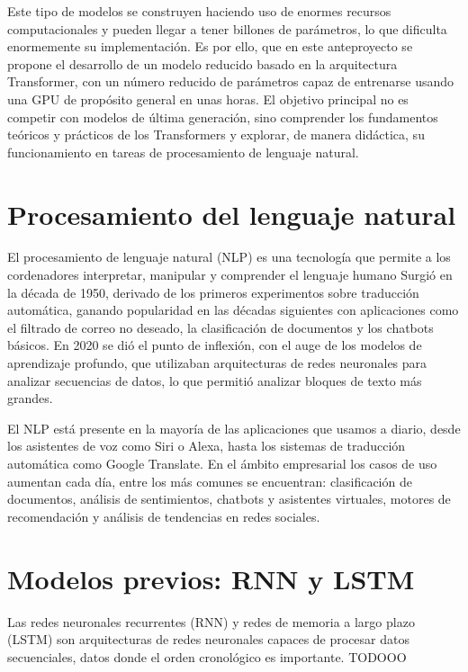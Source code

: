 \documentclass[11pt]{book}
\begin{document}
Este tipo de modelos se construyen haciendo uso de enormes recursos computacionales y pueden llegar a tener billones de parámetros, lo que dificulta enormemente su implementación. Es por ello, que en este anteproyecto se propone el desarrollo de un modelo reducido basado en la arquitectura Transformer, con un número reducido de parámetros capaz de entrenarse usando una GPU de propósito general en unas horas. El objetivo principal no es competir con modelos de última generación, sino comprender los fundamentos teóricos y prácticos de los Transformers y explorar, de manera didáctica, su funcionamiento en tareas de procesamiento de lenguaje natural.

\section{Procesamiento del lenguaje natural}

El procesamiento de lenguaje natural (NLP) es una tecnología que permite a los cordenadores interpretar, manipular y comprender el lenguaje humano Surgió en la década de 1950, derivado de los primeros experimentos sobre traducción automática, ganando popularidad en las décadas siguientes con aplicaciones como el filtrado de correo no deseado, la clasificación de documentos y los chatbots básicos. En 2020 se dió el punto de inflexión, con el auge de los modelos de aprendizaje profundo, que utilizaban arquitecturas de redes neuronales para analizar secuencias de datos, lo que permitió analizar bloques de texto más grandes.

El NLP está presente en la mayoría de las aplicaciones que usamos a diario, desde los asistentes de voz como Siri o Alexa, hasta los sistemas de traducción automática como Google Translate. En el ámbito empresarial los casos de uso aumentan cada día, entre los más comunes se encuentran: clasificación de documentos, análisis de sentimientos, chatbots y asistentes virtuales, motores de recomendación y análisis de tendencias en redes sociales.

\section{Modelos previos: RNN y LSTM}

Las redes neuronales recurrentes (RNN) y redes de memoria a largo plazo (LSTM) son arquitecturas de redes neuronales capaces de procesar datos secuenciales, datos donde el orden cronológico es importante.
TODOOO
\end{document}
